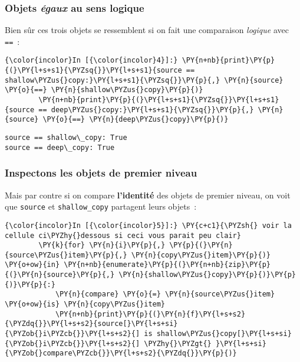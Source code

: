     \hypertarget{objets-uxe9gaux-au-sens-logique}{%
\subsubsection{\texorpdfstring{Objets \emph{égaux} au sens
logique}{Objets égaux au sens logique}}\label{objets-uxe9gaux-au-sens-logique}}

    Bien sûr ces trois objets se ressemblent si on fait une comparaison
\emph{logique} avec \texttt{==}~:

    \begin{Verbatim}[commandchars=\\\{\},frame=single,framerule=0.3mm,rulecolor=\color{cellframecolor}]
{\color{incolor}In [{\color{incolor}4}]:} \PY{n+nb}{print}\PY{p}{(}\PY{l+s+s1}{\PYZsq{}}\PY{l+s+s1}{source == shallow\PYZus{}copy:}\PY{l+s+s1}{\PYZsq{}}\PY{p}{,} \PY{n}{source} \PY{o}{==} \PY{n}{shallow\PYZus{}copy}\PY{p}{)}
        \PY{n+nb}{print}\PY{p}{(}\PY{l+s+s1}{\PYZsq{}}\PY{l+s+s1}{source == deep\PYZus{}copy:}\PY{l+s+s1}{\PYZsq{}}\PY{p}{,} \PY{n}{source} \PY{o}{==} \PY{n}{deep\PYZus{}copy}\PY{p}{)}
\end{Verbatim}


    \begin{Verbatim}[commandchars=\\\{\},frame=single,framerule=0.3mm,rulecolor=\color{cellframecolor}]
source == shallow\_copy: True
source == deep\_copy: True
\end{Verbatim}

    \hypertarget{inspectons-les-objets-de-premier-niveau}{%
\subsubsection{Inspectons les objets de premier
niveau}\label{inspectons-les-objets-de-premier-niveau}}

    Mais par contre si on compare \textbf{l'identité} des objets de premier
niveau, on voit que \texttt{source} et \texttt{shallow\_copy} partagent
leurs objets~:

    \begin{Verbatim}[commandchars=\\\{\},frame=single,framerule=0.3mm,rulecolor=\color{cellframecolor}]
{\color{incolor}In [{\color{incolor}5}]:} \PY{c+c1}{\PYZsh{} voir la cellule ci\PYZhy{}dessous si ceci vous parait peu clair}
        \PY{k}{for} \PY{n}{i}\PY{p}{,} \PY{p}{(}\PY{n}{source\PYZus{}item}\PY{p}{,} \PY{n}{copy\PYZus{}item}\PY{p}{)} \PY{o+ow}{in} \PY{n+nb}{enumerate}\PY{p}{(}\PY{n+nb}{zip}\PY{p}{(}\PY{n}{source}\PY{p}{,} \PY{n}{shallow\PYZus{}copy}\PY{p}{)}\PY{p}{)}\PY{p}{:}
            \PY{n}{compare} \PY{o}{=} \PY{n}{source\PYZus{}item} \PY{o+ow}{is} \PY{n}{copy\PYZus{}item}
            \PY{n+nb}{print}\PY{p}{(}\PY{n}{f}\PY{l+s+s2}{\PYZdq{}}\PY{l+s+s2}{source[}\PY{l+s+si}{\PYZob{}i\PYZcb{}}\PY{l+s+s2}{] is shallow\PYZus{}copy[}\PY{l+s+si}{\PYZob{}i\PYZcb{}}\PY{l+s+s2}{] \PYZhy{}\PYZgt{} }\PY{l+s+si}{\PYZob{}compare\PYZcb{}}\PY{l+s+s2}{\PYZdq{}}\PY{p}{)}
\end{Verbatim}


